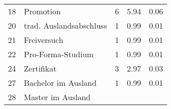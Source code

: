 \begin{longtable}{lXrrr}
     18 &
     \multicolumn{1}{X}{ Promotion   } &


       \num{6} &
       \num[round-mode=places,round-precision=2]{5.94} &
         \num[round-mode=places,round-precision=2]{0.06} \\

     20 &
     \multicolumn{1}{X}{ trad. Auslandsabschluss   } &


       \num{1} &
       \num[round-mode=places,round-precision=2]{0.99} &
         \num[round-mode=places,round-precision=2]{0.01} \\

     21 &
     \multicolumn{1}{X}{ Freiversuch   } &


       \num{1} &
       \num[round-mode=places,round-precision=2]{0.99} &
         \num[round-mode=places,round-precision=2]{0.01} \\

     22 &
     \multicolumn{1}{X}{ Pro-Forma-Studium   } &


       \num{1} &
       \num[round-mode=places,round-precision=2]{0.99} &
         \num[round-mode=places,round-precision=2]{0.01} \\

     24 &
     \multicolumn{1}{X}{ Zertifikat   } &


       \num{3} &
       \num[round-mode=places,round-precision=2]{2.97} &
         \num[round-mode=places,round-precision=2]{0.03} \\

     27 &
     \multicolumn{1}{X}{ Bachelor im Ausland   } &


       \num{1} &
       \num[round-mode=places,round-precision=2]{0.99} &
         \num[round-mode=places,round-precision=2]{0.01} \\

     28 &
     \multicolumn{1}{X}{ Master im Ausland   } &



\end{longtable}
